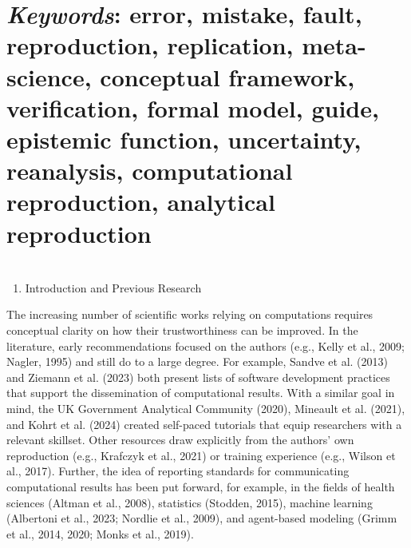 \documentclass[authordate, empirical]{jote-new-article}
\begin{document}
	\section{\emph{Keywords}: error, mistake, fault, reproduction, replication, meta-science, conceptual framework, verification, formal model, guide, epistemic function, uncertainty, reanalysis, computational reproduction, analytical reproduction}



	\section{}



	\section{}



	\section{}



	\section{}

	\begin{enumerate}


		\item Introduction and Previous Research


	\end{enumerate}

	The increasing number of scientific works relying on computations requires conceptual clarity on how their trustworthiness can be improved. In the literature, early recommendations focused on the authors (e.g., Kelly et al., 2009; Nagler, 1995) and still do to a large degree. For example, Sandve et al. (2013) and Ziemann et al. (2023) both present lists of software development practices that support the dissemination of computational results. With a similar goal in mind, the UK Government Analytical Community (2020), Mineault et al. (2021), and Kohrt et al. (2024) created self-paced tutorials that equip researchers with a relevant skillset. Other resources draw explicitly from the authors' own reproduction (e.g., Krafczyk et al., 2021) or training experience (e.g., Wilson et al., 2017). Further, the idea of reporting standards for communicating computational results has been put forward, for example, in the fields of health sciences (Altman et al., 2008), statistics (Stodden, 2015), machine learning (Albertoni et al., 2023; Nordlie et al., 2009), and agent-based modeling (Grimm et al., 2014, 2020; Monks et al., 2019).
\end{document}
